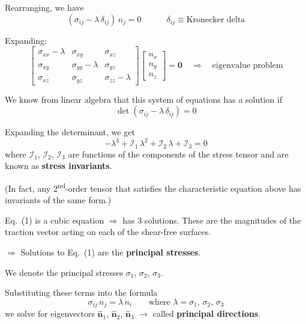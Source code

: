 \documentclass[11pt]{article}
\begin{document}
Rearranging, we have
\begin{equation}
  (\sigma_{ij} - \lambda\, \delta_{ij})\, n_j = 0
  \qquad\quad \delta_{ij} \equiv \text{Kronecker delta}
\end{equation}

Expanding:
\begin{equation}
  \begin{bmatrix}
    \sigma_{xx} - \lambda & \sigma_{xy} & \sigma_{xz} \\
    \sigma_{xy} & \sigma_{yy} - \lambda & \sigma_{yz} \\
    \sigma_{xz} & \sigma_{yz} & \sigma_{zz} - \lambda
  \end{bmatrix}
  \begin{bmatrix} n_x \\ n_y \\ n_z \end{bmatrix}
  = \bm{0}
  \quad \Rightarrow \quad \text{eigenvalue problem}
\end{equation}

We know from linear algebra that this system of equations has a solution if
\begin{equation}
  \det\!\left(\sigma_{ij} - \lambda\, \delta_{ij}\right) = 0
\end{equation}

Expanding the determinant, we get
\begin{equation}
  \boxed{-\lambda^3 + \mathcal{I}_1\, \lambda^2 + \mathcal{I}_2\, \lambda + \mathcal{I}_3 = 0}
  \tag{1}
\end{equation}
where $\mathcal{I}_1$, $\mathcal{I}_2$, $\mathcal{I}_3$ are functions of the components of the stress tensor and are known as \textbf{stress invariants}.

(In fact, any 2\textsuperscript{nd}-order tensor that satisfies the characteristic equation above has invariants of the same form.)

\medskip

Eq.~(1) is a cubic equation $\Rightarrow$ has 3 solutions.  These are the magnitudes of the traction vector acting on each of the shear-free surfaces.

$\Rightarrow$ Solutions to Eq.~(1) are the \textbf{principal stresses}.

We denote the principal stresses $\sigma_1$, $\sigma_2$, $\sigma_3$.

Substituting these terms into the formula
\begin{equation}
  \sigma_{ij}\, n_j = \lambda\, n_i \qquad \text{where } \lambda = \sigma_1,\, \sigma_2,\, \sigma_3
\end{equation}
we solve for eigenvectors $\hat{\bm{n}}_1$, $\hat{\bm{n}}_2$, $\hat{\bm{n}}_3$ $\to$ called \textbf{principal directions}.
\end{document}
